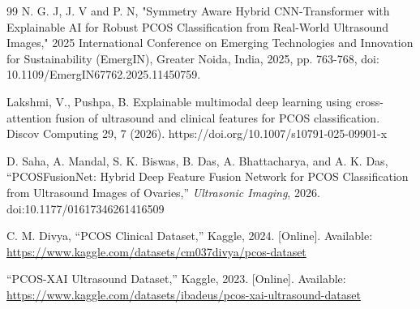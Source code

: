 \documentclass[conference]{IEEEtran}
\begin{document}
\begin{thebibliography}{99}
N. G. J, J. V and P. N, "Symmetry Aware Hybrid CNN-Transformer with Explainable AI for Robust PCOS Classification from Real-World Ultrasound Images," 2025 International Conference on Emerging Technologies and Innovation for Sustainability (EmergIN), Greater Noida, India, 2025, pp. 763-768, doi: 10.1109/EmergIN67762.2025.11450759.

Lakshmi, V., Pushpa, B. Explainable multimodal deep learning using cross-attention fusion of ultrasound and clinical features for PCOS classification. Discov Computing 29, 7 (2026). https://doi.org/10.1007/s10791-025-09901-x

D. Saha, A. Mandal, S. K. Biswas, B. Das, A. Bhattacharya, and A. K. Das, ``PCOSFusionNet: Hybrid Deep Feature Fusion Network for PCOS Classification from Ultrasound Images of Ovaries,'' \textit{Ultrasonic Imaging}, 2026. doi:10.1177/01617346261416509

C. M. Divya, ``PCOS Clinical Dataset,'' Kaggle, 2024. [Online]. Available: \url{https://www.kaggle.com/datasets/cm037divya/pcos-dataset}

``PCOS-XAI Ultrasound Dataset,'' Kaggle, 2023. [Online]. Available: \url{https://www.kaggle.com/datasets/ibadeus/pcos-xai-ultrasound-dataset}

\end{thebibliography}
\end{document}
